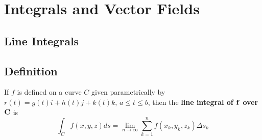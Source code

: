 \documentclass{article}
\begin{document}
    \newpage
    \section{Integrals and Vector Fields}
        \subsection{Line Integrals}
            \subsection{Definition} If $f$ is defined on a curve $C$ given parametrically by $r(t)=g(t)i+h(t)j+k(t)k$, $a\le t\le b$, then the \textbf{line integral of $\bf{f}$ over $\bf{C}$} is
            \[\int_C f(x,y,z)ds=\lim\limits_{n\to\infty}\sum_{k=1}^nf(x_k,y_k,z_k)\Delta s_k\]
            
\end{document}
